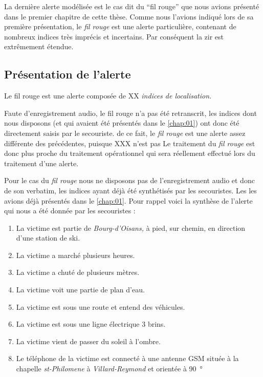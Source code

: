 
La dernière alerte modélisée est le cas dit du \enquote{fil rouge} que
nous avions présenté dans le premier chapitre de cette thèse. Comme
nous l'avions indiqué lors de sa première présentation, le \emph{fil
  rouge} est une alerte particulière, contenant de nombreux indices
très imprécis et incertains. Par conséquent la \ac{zir} est
extrêmement étendue.


\subsection{Présentation de l'alerte}
\label{subsec:9-4-1}

Le fil rouge est une alerte composée de XX \emph{indices de
  localisation.}


Faute d'enregistrement audio, le fil rouge n'a pas été retranscrit,
les indices dont nous disposons (et qui avaient été présentés dans le
\autoref{chap:01}) ont donc été directement saisis par le secouriste.
%
de ce fait, le \emph{fil rouge} est une alerte assez différente des
précédentes, puisque XXX n'est pas
%
Le traitement du \emph{fil rouge} est donc plus proche du traitement
opérationnel qui sera réellement effectué lors du traitement d'une
alerte.


Pour le cas du \emph{fil rouge} nous ne disposons pas de
l'enregistrement audio et donc de son verbatim, les indices ayant déjà 
été synthétisés par les secouristes. Les les avions déjà présentés
dans le \autoref{chap:01}.
%
Pour rappel voici la synthèse de l'alerte qui nous a été donnée par
les secouristes :
%
\begin{enumerate}
\item La victime est partie de \emph{Bourg-d'Oisans,} à pied, sur
  chemin, en direction d'une station de ski.
\item La victime a marché plusieurs heures.
\item La victime a chuté de plusieurs mètres.
\item La victime voit une partie de plan d'eau.
\item La victime est sous une route et entend des véhicules.
\item La victime est sous une ligne électrique 3 brins.
\item La victime vient de passer du soleil à l'ombre.
\item Le téléphone de la victime est connecté à une antenne GSM située
  à la chapelle \emph{st-Philomene} à \emph{Villard-Reymond} et
  orientée à \SI{90}{\degree}
\end{enumerate}


